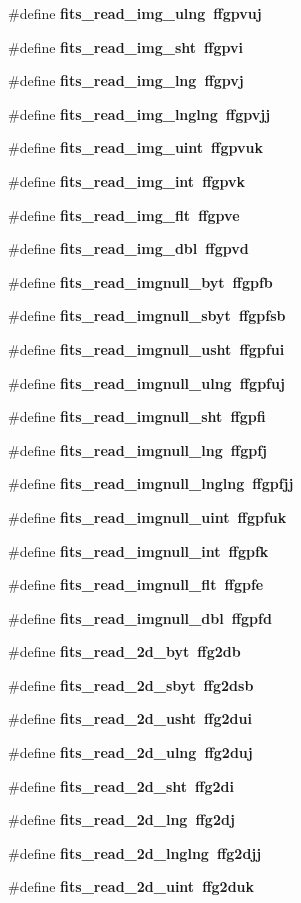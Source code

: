 \begin{CompactItemize}
\#define \bf{fits\_\-read\_\-img\_\-ulng}~ffgpvuj
\item 
\#define \bf{fits\_\-read\_\-img\_\-sht}~ffgpvi
\item 
\#define \bf{fits\_\-read\_\-img\_\-lng}~ffgpvj
\item 
\#define \bf{fits\_\-read\_\-img\_\-lnglng}~ffgpvjj
\item 
\#define \bf{fits\_\-read\_\-img\_\-uint}~ffgpvuk
\item 
\#define \bf{fits\_\-read\_\-img\_\-int}~ffgpvk
\item 
\#define \bf{fits\_\-read\_\-img\_\-flt}~ffgpve
\item 
\#define \bf{fits\_\-read\_\-img\_\-dbl}~ffgpvd
\item 
\#define \bf{fits\_\-read\_\-imgnull\_\-byt}~ffgpfb
\item 
\#define \bf{fits\_\-read\_\-imgnull\_\-sbyt}~ffgpfsb
\item 
\#define \bf{fits\_\-read\_\-imgnull\_\-usht}~ffgpfui
\item 
\#define \bf{fits\_\-read\_\-imgnull\_\-ulng}~ffgpfuj
\item 
\#define \bf{fits\_\-read\_\-imgnull\_\-sht}~ffgpfi
\item 
\#define \bf{fits\_\-read\_\-imgnull\_\-lng}~ffgpfj
\item 
\#define \bf{fits\_\-read\_\-imgnull\_\-lnglng}~ffgpfjj
\item 
\#define \bf{fits\_\-read\_\-imgnull\_\-uint}~ffgpfuk
\item 
\#define \bf{fits\_\-read\_\-imgnull\_\-int}~ffgpfk
\item 
\#define \bf{fits\_\-read\_\-imgnull\_\-flt}~ffgpfe
\item 
\#define \bf{fits\_\-read\_\-imgnull\_\-dbl}~ffgpfd
\item 
\#define \bf{fits\_\-read\_\-2d\_\-byt}~ffg2db
\item 
\#define \bf{fits\_\-read\_\-2d\_\-sbyt}~ffg2dsb
\item 
\#define \bf{fits\_\-read\_\-2d\_\-usht}~ffg2dui
\item 
\#define \bf{fits\_\-read\_\-2d\_\-ulng}~ffg2duj
\item 
\#define \bf{fits\_\-read\_\-2d\_\-sht}~ffg2di
\item 
\#define \bf{fits\_\-read\_\-2d\_\-lng}~ffg2dj
\item 
\#define \bf{fits\_\-read\_\-2d\_\-lnglng}~ffg2djj
\item 
\#define \bf{fits\_\-read\_\-2d\_\-uint}~ffg2duk
\item 

\end{CompactItemize}
